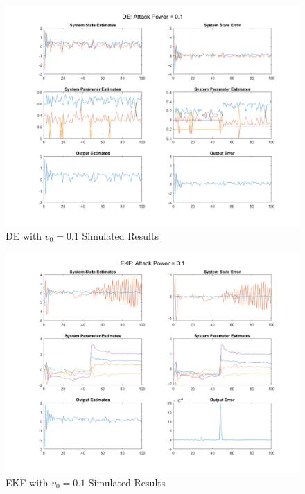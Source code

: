 \documentclass[]{article}
\begin{document}
\begin{figure}
	\centering
	\includegraphics[width=\linewidth]{../../fig/DE_attack_0_1}
	\caption{DE with $v_0 = 0.1$ Simulated Results}
	\label{fig:deattack001}
\end{figure}

\begin{figure}
	\centering
	\includegraphics[width=\linewidth]{../../fig/EKF_attack_0_1}
	\caption{EKF with $v_0 = 0.1$ Simulated Results}
	\label{fig:ekfattack01}
\end{figure}
\end{document}
